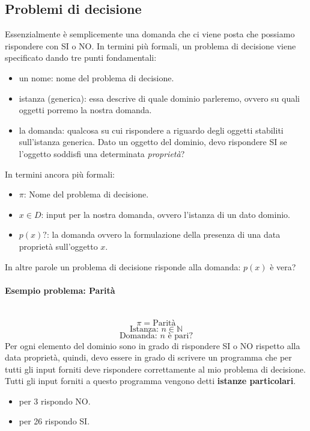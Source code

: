 \documentclass{article}
\begin{document}
\subsection{Problemi di decisione}
Essenzialmente è semplicemente una domanda che ci viene posta che possiamo rispondere con SI o NO. In termini
più formali, un problema di decisione viene specificato dando tre punti fondamentali:
\begin{itemize}
    \item un nome: nome del problema di decisione.
    \item istanza (generica): essa descrive di quale dominio parleremo, ovvero su quali oggetti porremo la nostra
          domanda.
    \item la domanda: qualcosa su cui rispondere a riguardo degli oggetti stabiliti sull'istanza generica. Dato
          un oggetto del dominio, devo rispondere SI se l'oggetto soddisfi una determinata \textit{proprietà}?
\end{itemize}
In termini ancora più formali:
\begin{itemize}
    \item $\pi$: Nome del problema di decisione.
    \item $x\in D$: input per la nostra domanda, ovvero l'istanza di un dato dominio.
    \item $p(x)?$: la domanda ovvero la formulazione della presenza di una data proprietà sull'oggetto $x$.
\end{itemize}
In altre parole un problema di decisione risponde alla domanda: $p(x)$ è vera?

\paragraph{Esempio problema: Parità}\mbox{}\\
$$\pi=\text{Parità}$$
$$\text{Istanza: }n\in\mathbb{N}$$
$$\text{Domanda: }n \text{ è pari?}$$
Per ogni elemento del dominio sono in grado di rispondere SI o NO rispetto alla data proprietà, quindi,
devo essere in grado di scrivere un programma che per tutti gli input forniti deve rispondere correttamente
al mio problema di decisione.
Tutti gli input forniti a questo programma vengono detti \textbf{istanze particolari}.
\begin{itemize}
    \item per 3 rispondo NO.
    \item per 26 rispondo SI.
\end{itemize}
\end{document}
